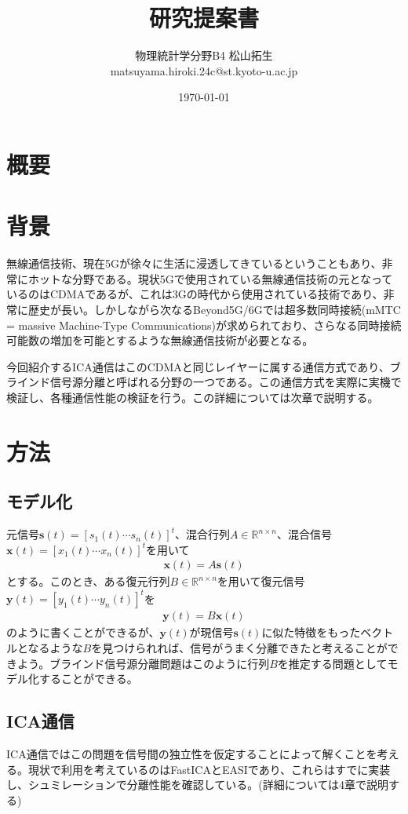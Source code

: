 \documentclass{jsarticle}
\title{研究提案書}
\author{物理統計学分野B4 松山拓生 \\ matsuyama.hiroki.24c@st.kyoto-u.ac.jp}
\date{\today}
\begin{document}
\maketitle

\section{概要}

\section{背景}
無線通信技術、現在5Gが徐々に生活に浸透してきているということもあり、非常にホットな分野である。現状5Gで使用されている無線通信技術の元となっているのはCDMA\cite{cdma-overview}であるが、これは3Gの時代から使用されている技術であり、非常に歴史が長い。しかしながら次なるBeyond5G/6Gでは超多数同時接続\cite{mmtc}(mMTC = massive Machine-Type Communications)が求められており、さらなる同時接続可能数の増加を可能とするような無線通信技術が必要となる。

今回紹介するICA通信\cite{red-book}はこのCDMAと同じレイヤーに属する通信方式であり、ブラインド信号源分離と呼ばれる分野の一つである。この通信方式を実際に実機で検証し、各種通信性能の検証を行う。この詳細については次章で説明する。

\section{方法}
\subsection{モデル化}
元信号$\textbf{s}(t) = [s_1(t) \cdots s_n(t)]^t$、混合行列$A\in \mathbb{R}^{n\times n}$、混合信号$\textbf{x}(t) = [x_1(t) \cdots x_n(t)]^t$を用いて
\begin{gather}
    \textbf{x}(t) = A\textbf{s}(t)
\end{gather}
とする。このとき、ある復元行列$B\in \mathbb{R}^{n\times n}$を用いて復元信号$\textbf{y}(t)= [y_1(t) \cdots y_n(t)]^t$を
\begin{gather}
    \textbf{y}(t) = B\textbf{x}(t)
\end{gather}
のように書くことができるが、$\textbf{y}(t)$が現信号$\textbf{s}(t)$に似た特徴をもったベクトルとなるような$B$を見つけられれば、信号がうまく分離できたと考えることができよう。ブラインド信号源分離問題はこのように行列$B$を推定する問題としてモデル化することができる。

\subsection{ICA通信}
ICA通信ではこの問題を信号間の独立性を仮定することによって解くことを考える。現状で利用を考えているのはFastICA\cite{fastica}とEASI\cite{easi}であり、これらはすでに実装し、シュミレーションで分離性能を確認している。(詳細については4章で説明する)
\end{document}
